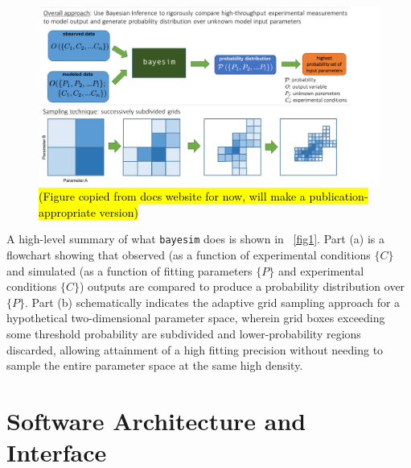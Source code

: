 \documentclass[aps,prl,amsmath,amssymb,superscriptaddress,notitlepage,groupedaddress]{revtex4-1}
\begin{document}
 \begin{figure}
   \includegraphics[width=0.9\columnwidth]{figure_1.png}
   \caption{\hl{(Figure copied from docs website for now, will make a publication-appropriate version)}}
   \label{fig1}
 \end{figure}

 A high-level summary of what \texttt{bayesim} does is shown in ~\autoref{fig1}. Part (a) is a flowchart showing that observed (as a function of experimental conditions $\{C\}$ and simulated (as a function of fitting parameters $\{P\}$ and experimental conditions $\{C\}$) outputs are compared to produce a probability distribution over $\{P\}$. Part (b) schematically indicates the adaptive grid sampling approach for a hypothetical two-dimensional parameter space, wherein grid boxes exceeding some threshold probability are subdivided and lower-probability regions discarded, allowing attainment of a high fitting precision without needing to sample the entire parameter space at the same high density.

\section*{Software Architecture and Interface}
\end{document}

